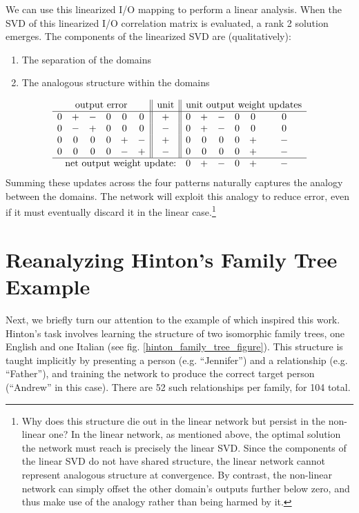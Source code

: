 \documentclass[10pt,letterpaper]{article}
\begin{document}
We can use this linearized I/O mapping to perform a linear analysis. When the SVD of this linearized I/O correlation matrix is evaluated, a rank 2 solution emerges. The components of the linearized SVD are (qualitatively): \begin{enumerate}
\itemsep-0.25em
\item The separation of the domains
\item The analogous structure within the domains
\end{enumerate}
\vspace{-1em}
{ 
\[
\begin{array}{cccccc||c||cccccc} 
\multicolumn{6}{c||}{\text{output error}}  & \text{unit}  & \multicolumn{6}{c}{\text{unit output weight updates}} \\
\hline
 0 & + & - & 0 & 0 & 0  &   +    &  0 & + & - & 0 & 0 & 0   \\
0 & - & + & 0 & 0 & 0  &   -  & 0 & + & - & 0 & 0 & 0   \\
 0 & 0 & 0 & 0 & + & - &   +   &  0 & 0 & 0 & 0 & + & - \\
 0 & 0 & 0 & 0 & - & +  &  - &  0 & 0 & 0 & 0 & + & - \\
\hline
\multicolumn{7}{r}{\text{net output weight update:}} &   0 & + & - & 0 & + & - \\
\end{array} 
\]
}
Summing these updates across the four patterns naturally captures the analogy between the domains. The network will exploit this analogy to reduce error, even if it must eventually discard it in the linear case.\footnote{ Why does this structure die out in the linear network but persist in the non-linear one? In the linear network, as mentioned above, the optimal solution the network must reach is precisely the linear SVD. Since the components of the linear SVD do not have shared structure, the linear network cannot represent analogous structure at convergence. By contrast, the non-linear network can simply offset the other domain's outputs further below zero, and thus make use of the analogy rather than being harmed by it.} \par 
\section{Reanalyzing Hinton's Family Tree Example}
Next, we briefly turn our attention to the example of \citet{Hinton1986} which inspired this work. Hinton's task involves learning the structure of two isomorphic family trees, one English and one Italian (see fig. \ref{hinton_family_tree_figure}). This structure is taught implicitly by presenting a person (e.g. ``Jennifer'') and a relationship (e.g. ``Father''), and training the network to produce the correct target person (``Andrew'' in this case). There are 52 such relationships per family, for 104 total. \par
\end{document}
